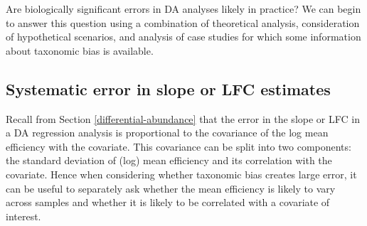 \documentclass[
]{article}
\begin{document}
Are biologically significant errors in DA analyses likely in practice?
We can begin to answer this question using a combination of theoretical analysis, consideration of hypothetical scenarios, and analysis of case studies for which some information about taxonomic bias is available.

\hypertarget{systematic-error-in-slope-or-lfc-estimates}{%
\subsection{Systematic error in slope or LFC estimates}\label{systematic-error-in-slope-or-lfc-estimates}}

Recall from Section \ref{differential-abundance} that the error in the slope or LFC in a DA regression analysis is proportional to the covariance of the log mean efficiency with the covariate.
This covariance can be split into two components: the standard deviation of (log) mean efficiency and its correlation with the covariate.
Hence when considering whether taxonomic bias creates large error, it can be useful to separately ask whether the mean efficiency is likely to vary across samples and whether it is likely to be correlated with a covariate of interest.
\end{document}
